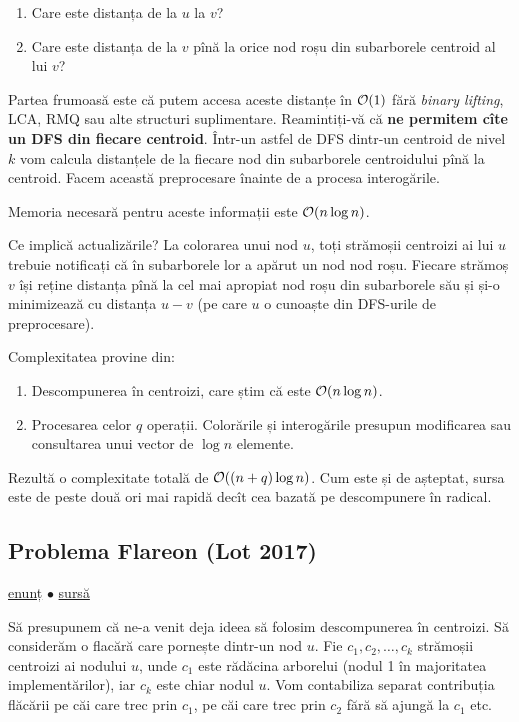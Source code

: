 \documentclass[../main.tex]{subfiles}
\begin{document}
\begin{enumerate}
  \item Care este distanța de la $u$ la $v$?
  \item Care este distanța de la $v$ pînă la orice nod roșu din subarborele centroid al lui $v$?
\end{enumerate}

Partea frumoasă este că putem accesa aceste distanțe în $\mathcal{O}(1)$ fără \textit{binary lifting}, LCA, RMQ sau alte structuri suplimentare. Reamintiți-vă că \textbf{ne permitem cîte un DFS din fiecare centroid}. Într-un astfel de DFS dintr-un centroid de nivel $k$ vom calcula distanțele de la fiecare nod din subarborele centroidului pînă la centroid. Facem această preprocesare înainte de a procesa interogările.

Memoria necesară pentru aceste informații este $\mathcal{O}(n \log n)$.

Ce implică actualizările? La colorarea unui nod $u$, toți strămoșii centroizi ai lui $u$ trebuie notificați că în subarborele lor a apărut un nod nod roșu. Fiecare strămoș $v$ își reține distanța pînă la cel mai apropiat nod roșu din subarborele său și și-o minimizează cu distanța $u-v$ (pe care $u$ o cunoaște din DFS-urile de preprocesare).

Complexitatea provine din:

\begin{enumerate}
  \item Descompunerea în centroizi, care știm că este $\mathcal{O}(n \log n)$.
  \item Procesarea celor $q$ operații. Colorările și interogările presupun modificarea sau consultarea unui vector de $\log n$ elemente.
\end{enumerate}

Rezultă o complexitate totală de $\mathcal{O}((n + q) \log n)$. Cum este și de așteptat, sursa este de peste două ori mai rapidă decît cea bazată pe descompunere în radical.

\subsection{Problema Flareon (Lot 2017)}
\label{problem:flareon}

\href{https://kilonova.ro/problems/593}{enunț}
$\bullet$
\hyperref[code:flareon]{sursă}

Să presupunem că ne-a venit deja ideea să folosim descompunerea în centroizi.  Să considerăm o flacără care pornește dintr-un nod $u$. Fie $c_1, c_2, \dots, c_k$ strămoșii centroizi ai nodului $u$, unde $c_1$ este rădăcina arborelui (nodul 1 în majoritatea implementărilor), iar $c_k$ este chiar nodul $u$. Vom contabiliza separat contribuția flăcării pe căi care trec prin $c_1$, pe căi care trec prin $c_2$ fără să ajungă la $c_1$ etc.
\end{document}
